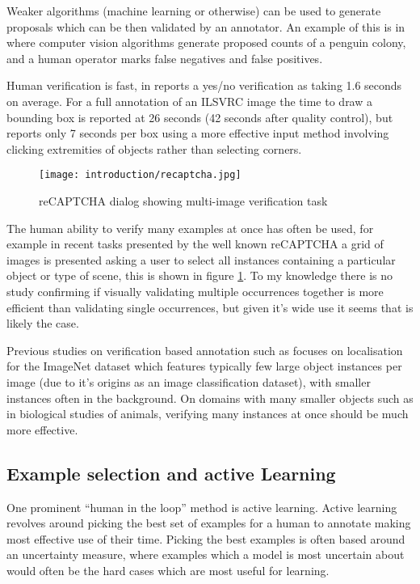 Weaker algorithms (machine learning or otherwise) can be used to generate proposals which can be then validated by an annotator. An example of this is in \cite{McNeill2011} where computer vision algorithms generate proposed counts of a penguin colony, and a human operator marks false negatives and false positives.

Human verification is fast, in \cite{Papadopoulos2016} reports a yes/no verification as taking 1.6 seconds on average. For a full annotation of an \gls{ILSVRC} image \cite {Su2012a} the time to draw a bounding box is reported at 26 seconds (42 seconds after quality control), but \cite{Papadopoulos2017} reports only 7 seconds per box using a more effective input method involving clicking extremities of objects rather than selecting corners. 

\begin{figure}[h]
  \centering
  \texttt{[image: introduction/recaptcha.jpg]}
  \caption{reCAPTCHA dialog showing multi-image verification task}  
  \label{fig:captcha}
\end{figure}

The human ability to verify many examples at once has often be used, for example in recent tasks presented by the well known reCAPTCHA \cite{von2008recaptcha} a grid of images is presented asking a user to select all instances containing a particular object or type of scene, this is shown in figure \ref{fig:captcha}. To my knowledge there is no study confirming if visually validating multiple occurrences together is more efficient than validating single occurrences, but given it's wide use it seems that is likely the case. 

Previous studies on verification based annotation such as \cite{Papadopoulos2016} focuses on localisation for the ImageNet dataset which features typically few large object instances per image (due to it's origins as an image classification dataset), with smaller instances often in the background. On domains with many smaller objects such as in biological studies of animals, verifying many instances at once should be much more effective. 


\subsection{Example selection and active Learning} 

One prominent ``human in the loop'' method is active learning. Active learning revolves around picking the best set of examples for a human to annotate making most effective use of their time. Picking the best examples is often based around an uncertainty measure, where examples which a model is most uncertain about would often be the hard cases which are most useful for learning. 
 
